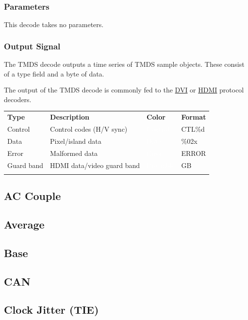 \documentclass[11pt]{article}
\newcommand{\thickhline}{\Xhline{2.5\arrayrulewidth}}
\begin{document}
\subsubsection{Parameters}

This decode takes no parameters.

\subsubsection{Output Signal}

The TMDS decode outputs a time series of TMDS sample objects. These consist of a type field and a byte of data.

The output of the TMDS decode is commonly fed to the \hyperref[filter:dvi]{DVI} or \hyperref[filter:hdmi]{HDMI}
protocol decoders.

\begin{tabularx}{16cm}{lllX}
\thickhline
\textbf{Type} & \textbf{Description} & \textbf{Color} & \textbf{Format} \\
\thickhline
Control & Control codes (H/V sync) & \cellcolor{control}\textcolor{white}{Control} & CTL\%d \\
\thickhline
Data & Pixel/island data & \cellcolor{data}\textcolor{white}{Data} & \%02x \\
\thickhline
Error & Malformed data & \cellcolor{error}\textcolor{white}{Error} & ERROR \\
\thickhline
Guard band & HDMI data/video guard band & \cellcolor{preamble}\textcolor{white}{Preamble} & GB \\
\thickhline
\end{tabularx}

\subsection{AC Couple}
\subsection{Average}
\subsection{Base}
\subsection{CAN}
\subsection{Clock Jitter (TIE)}
\end{document}

